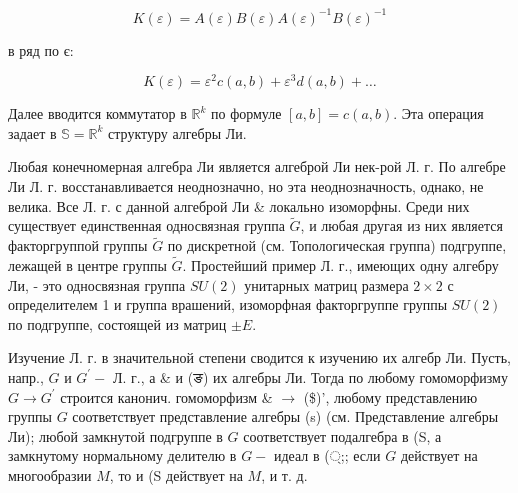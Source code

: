 \documentclass[10pt]{article}
\begin{document}
\[

K(\varepsilon)=A(\varepsilon) B(\varepsilon) A(\varepsilon)^{-1} B(\varepsilon)^{-1}

\]



в ряд по є:



\[

K(\varepsilon)=\varepsilon^{2} c(a, b)+\varepsilon^{3} d(a, b)+\ldots

\]



Далее вводится коммутатор в $\mathbb{R}^{k}$ по формуле $[a, b]=c(a, b)$. Эта операция задает в $\mathbb{S}=\mathbb{R}^{k}$ структуру алгебры Ли.



Любая конечномерная алгебра Ли является алгеброй Ли нек-рой Л. г. По алгебре Ли Л. г. восстанавливается неоднозначно, но эта неоднозначность, однако, не велика. Все Л. г. с данной алгеброй Ли \& локально изоморфны. Среди них существует единственная односвязная группа $\widetilde{G}$, и любая другая из них является факторгруппой группы $\widetilde{G}$ по дискретной (см. Топологическая группа) подгруппе, лежащей в центре группы $\widetilde{G}$. Простейший пример Л. г., имеющих одну алгебру Ли, - это односвязная группа $S U(2)$ унитарных матриц размера $2 \times 2$ с определителем 1 и группа врашений, изоморфная факторгруппе группы $S U(2)$ по подгруппе, состоящей из матриц $\pm E$.



Изучение Л. г. в значительной степени сводится к изучению их алгебр Ли. Пусть, напр., $G$ и $G^{\prime}-$ Л. г., а \& и (ङ) их алгебры Ли. Тогда по любому гомоморфизму $G \rightarrow G^{\prime}$ строится канонич. гомоморфизм \& $\rightarrow$ (\$)', любому представлению группы $G$ соответствует представление алгебры (s) (см. Представление алгебры Ли); любой замкнутой подгруппе в $G$ соответствует подалгебра в (S, а замкнутому нормальному делителю в $G-$ идеал в (্;; если $G$ действует на многообразии $M$, то и (S действует на $M$, и т. д.
\end{document}
